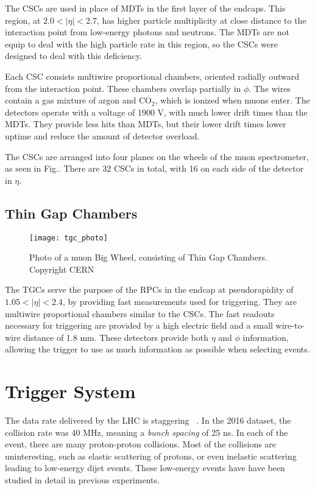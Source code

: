 The CSCs are used in place of MDTs in the first layer of the endcaps.
This region, at $2.0 < |\eta| < 2.7$, has higher particle multiplicity at close distance to the interaction point from low-energy photons and neutrons.
The MDTs are not equip to deal with the high particle rate in this region, so the CSCs were designed to deal with this deficiency.

Each CSC consists multiwire proportional chambers, oriented radially outward from the interaction point.
These chambers overlap partially in $\phi$.
The wires contain a gas mixture of argon and CO$_2$, which is ionized when muons enter.
The detectors operate with a voltage of 1900 V, with much lower drift times than the MDTs.
They provide less hits than MDTs, but their lower drift times lower uptime and reduce the amount of detector overload.

The CSCs are arranged into four planes on the wheels of the muon spectrometer, as seen in Fig..
There are 32 CSCs in total, with 16 on each side of the detector in $\eta.$

\subsection{Thin Gap Chambers}
\begin{figure}[tbp]
\caption{Photo of a muon Big Wheel, consisting of Thin Gap Chambers. Copyright CERN} \label{fig:tgc_photo}
\texttt{[image: tgc\_photo]}
\end{figure}

The TGCs serve the purpose of the RPCs in the endcap at pseudorapidity of $1.05 < |\eta| < 2.4 $, by providing fast measurements used for triggering.
They are multiwire proportional chambers similar to the CSCs.
The fast readouts necessary for triggering are provided by a high electric field and a small wire-to-wire distance of 1.8 mm.
These detectors provide both $\eta$ and $\phi$ information, allowing the trigger to use as much information as possible when selecting events.

\section{Trigger System}\label{sec:trigger}

The data rate delivered by the LHC is staggering ~\cite{ATL-DAQ-PUB-2016-001}.
In the 2016 dataset, the collision rate was 40 MHz, meaning a \textit{bunch spacing} of 25 ns.
In each of the event, there are many proton-proton collisions.
Most of the collisions are uninteresting, such as elastic scattering of protons, or even inelastic scattering leading to low-energy dijet events.
These low-energy events have have been studied in detail in previous experiments.

